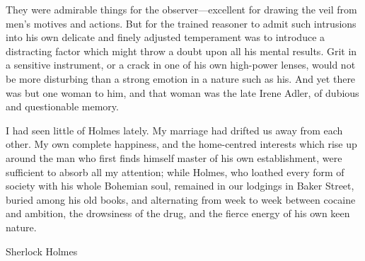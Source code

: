 \documentclass[a4paper,12pt]{article}
\begin{document}
They were admirable things for the observer—excellent
for drawing the veil from men’s motives and actions. But for the
trained reasoner to admit such intrusions into his own delicate and
finely adjusted temperament was to introduce a distracting factor which
might throw a doubt upon all his mental results. Grit in a sensitive
instrument, or a crack in one of his own high-power lenses, would not
be more disturbing than a strong emotion in a nature such as his. And
yet there was but one woman to him, and that woman was the late Irene
Adler, of dubious and questionable memory.

I had seen little of Holmes lately. My marriage had drifted us away
from each other. My own complete happiness, and the home-centred
interests which rise up around the man who first finds himself master
of his own establishment, were sufficient to absorb all my attention;
while Holmes, who loathed every form of society with his whole
Bohemian soul, remained in our lodgings in Baker Street, buried among
his old books, and alternating from week to week between cocaine and
ambition, the drowsiness of the drug, and the fierce energy of his
own keen nature.

\vspace{1cm}
\hspace{10cm} Sherlock Holmes
\end{document}
